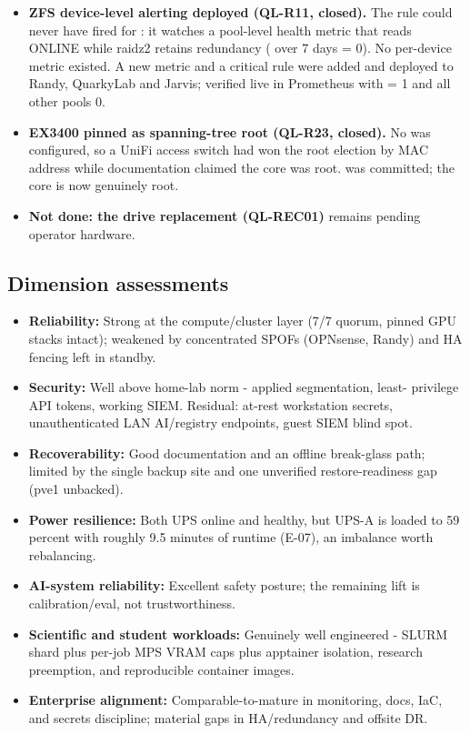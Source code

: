 \begin{itemize}
  \item \textbf{ZFS device-level alerting deployed (QL-R11, closed).} The
   rule could never have fired for : it watches a
  pool-level health metric that reads ONLINE while raidz2 retains redundancy
  ( over 7 days = 0). No per-device metric existed. A new
   metric and a critical
   rule were added and deployed to Randy, QuarkyLab and Jarvis;
  verified live in Prometheus with  = 1 and all other pools 0.
  \item \textbf{EX3400 pinned as spanning-tree root (QL-R23, closed).} No
   was configured, so a UniFi access switch had won the root
  election by MAC address while documentation claimed the core was root.
   was committed; the core is now genuinely root.
  \item \textbf{Not done: the drive replacement (QL-REC01)} remains pending operator
  hardware.
\end{itemize}

\subsection{Dimension assessments}

\begin{itemize}
  \item \textbf{Reliability:} Strong at the compute/cluster layer (7/7 quorum,
  pinned GPU stacks intact); weakened by concentrated SPOFs (OPNsense, Randy) and
  HA fencing left in standby.
  \item \textbf{Security:} Well above home-lab norm - applied segmentation, least-
  privilege API tokens, working SIEM. Residual: at-rest workstation secrets,
  unauthenticated LAN AI/registry endpoints, guest SIEM blind spot.
  \item \textbf{Recoverability:} Good documentation and an offline break-glass path;
  limited by the single backup site and one unverified restore-readiness gap
  (pve1 unbacked).
  \item \textbf{Power resilience:} Both UPS online and healthy, but UPS-A is loaded
  to 59 percent with roughly 9.5 minutes of runtime (E-07), an imbalance worth
  rebalancing.
  \item \textbf{AI-system reliability:} Excellent safety posture; the remaining lift
  is calibration/eval, not trustworthiness.
  \item \textbf{Scientific and student workloads:} Genuinely well engineered - SLURM
  shard plus per-job MPS VRAM caps plus apptainer isolation, research preemption,
  and reproducible container images.
  \item \textbf{Enterprise alignment:} Comparable-to-mature in monitoring, docs,
  IaC, and secrets discipline; material gaps in HA/redundancy and offsite DR.
\end{itemize}


